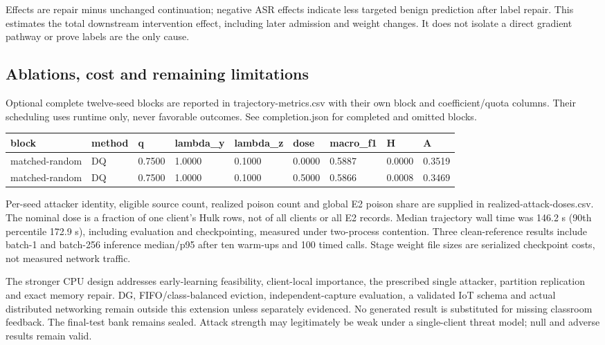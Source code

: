 \documentclass[
  10pt,
  a4paper,
]{article}
\begin{document}
Effects are repair minus unchanged continuation; negative ASR effects
indicate less targeted benign prediction after label repair. This
estimates the total downstream intervention effect, including later
admission and weight changes. It does not isolate a direct gradient
pathway or prove labels are the only cause.

\hypertarget{ablations-cost-and-remaining-limitations}{%
\subsection{Ablations, cost and remaining
limitations}\label{ablations-cost-and-remaining-limitations}}

Optional complete twelve-seed blocks are reported in
trajectory-metrics.csv with their own block and coefficient/quota
columns. Their scheduling uses runtime only, never favorable outcomes.
See completion.json for completed and omitted blocks.

\begin{longtable}[]{@{}lllllllll@{}}
\toprule
block & method & q & lambda\_y & lambda\_z & dose & macro\_f1 & H & A \\
\midrule
\endhead
matched-random & DQ & 0.7500 & 1.0000 & 0.1000 & 0.0000 & 0.5887 &
0.0000 & 0.3519 \\
matched-random & DQ & 0.7500 & 1.0000 & 0.1000 & 0.5000 & 0.5866 &
0.0008 & 0.3469 \\
\bottomrule
\end{longtable}

Per-seed attacker identity, eligible source count, realized poison count
and global E2 poison share are supplied in realized-attack-doses.csv.
The nominal dose is a fraction of one client's Hulk rows, not of all
clients or all E2 records. Median trajectory wall time was 146.2 s (90th
percentile 172.9 s), including evaluation and checkpointing, measured
under two-process contention. Three clean-reference results include
batch-1 and batch-256 inference median/p95 after ten warm-ups and 100
timed calls. Stage weight file sizes are serialized checkpoint costs,
not measured network traffic.

The stronger CPU design addresses early-learning feasibility,
client-local importance, the prescribed single attacker, partition
replication and exact memory repair. DG, FIFO/class-balanced eviction,
independent-capture evaluation, a validated IoT schema and actual
distributed networking remain outside this extension unless separately
evidenced. No generated result is substituted for missing classroom
feedback. The final-test bank remains sealed. Attack strength may
legitimately be weak under a single-client threat model; null and
adverse results remain valid.
\end{document}
